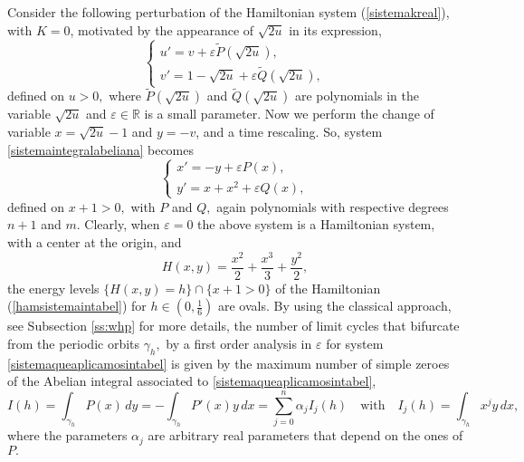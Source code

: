\documentclass[12pt,a4paper,reqno]{amsart}
\newcommand{\re}{\mathbb{R}}
\begin{document}
Consider the following perturbation of the Hamiltonian system
(\ref{sistemakreal}), with $K=0$, motivated by the appearance of
$\sqrt{2u}$ in its expression,
    \begin{equation}\label{sistemaintegralabeliana}
    \left\{ \begin{array}{l}
    u' = v + \varepsilon \widetilde{P}(\sqrt{2u}),   \\
    v' =  1 - \sqrt{2u} + \varepsilon \widetilde{Q}(\sqrt{2u}),
    \end{array}
    \right.
    \end{equation}
    defined on $u>0,$ where $\widetilde{P}(\sqrt{2u})$ and $\widetilde{Q}(\sqrt{2u})$ are
    polynomials in the variable $\sqrt{2u}$ and $\varepsilon \in \re$ is a small parameter.
     Now we perform the change of variable $x=\sqrt{2u}-1$ and $y=-v$, and a time rescaling. So, system \eqref{sistemaintegralabeliana} becomes
    \begin{equation}\label{sistemaqueaplicamosintabel}
    \left\{ \begin{array}{l}
    x' = -y + \varepsilon P(x), \\
    y'=  x + x^2 + \varepsilon  Q(x),
    \end{array} \right.
    \end{equation}
     defined on $x+1>0,$ with $P$ and $Q,$ again polynomials with respective degrees $n+1$ and $m.$ Clearly, when  $\varepsilon=0$ the above
     system is a Hamiltonian system, with a center at the origin, and
    \begin{equation}\label{hamsistemaintabel}
    H(x,y)= \frac{x^2}{2} + \frac{x^3}{3}+ \frac{y^2}2,
    \end{equation}
    the energy levels $\{H(x,y)=h\}\cap\{x+1>0\}$ of the Hamiltonian (\ref{hamsistemaintabel}) for $h \in (0, \frac{1}{6})$ are ovals.
By using the classical approach, see Subsection \ref{ss:whp} for
more details, the number of limit cycles that bifurcate from the
periodic orbits $\gamma_h,$ by a first order analysis in
$\varepsilon$ for system \eqref{sistemaqueaplicamosintabel} is given
by the maximum number of simple zeroes of the Abelian integral
associated to \eqref{sistemaqueaplicamosintabel},
\begin{equation}\label{eq:final}
I(h)=\int_{\gamma_h} P(x)\,dy=-\int_{\gamma_h} P'(x) y\,
dx=\sum_{j=0}^{n} \alpha_j I_{j}(h)\quad\mbox{with}\quad I_j(h)=
\displaystyle \int_{\gamma_h} x^j y\,  dx,
\end{equation}
where the parameters $\alpha_j$ are arbitrary real parameters that
depend on the ones of $P.$
\end{document}
